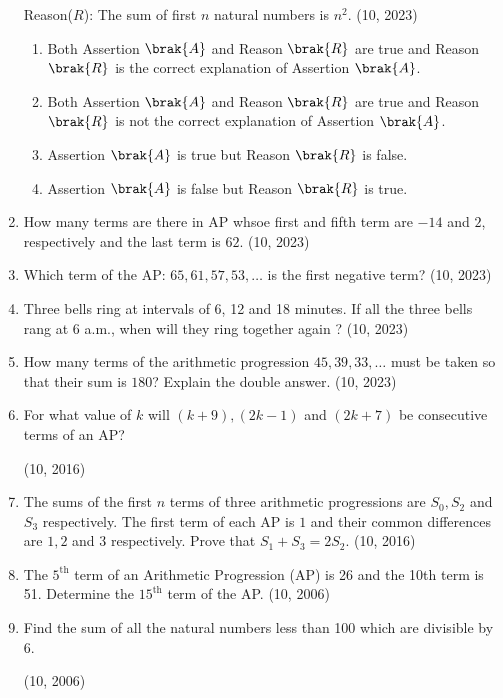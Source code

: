 \begin{enumerate}[label=\thesubsection.\arabic*,ref=\thesubsection.\theenumi,itemsep=1pt]
%
{Reason($R$):} The sum of first $n$ natural numbers is $n^2$.
\hfill (10, 2023)
\begin{enumerate}
\item Both Assertion $\brak{A}$ and Reason $\brak{R}$ are true and Reason $\brak{R}$ is the correct explanation of Assertion $\brak{A}$.
\item Both Assertion $\brak{A}$ and Reason $\brak{R}$ are true and Reason $\brak{R}$ is not the correct explanation of Assertion $\brak{A}$.
\item Assertion $\brak{A}$ is true but Reason $\brak{R}$ is false.
\item Assertion $\brak{A}$ is false but Reason $\brak{R}$ is true.
\end{enumerate}
\item
How many terms are there in  AP  whsoe first and fifth term are $-14$ and $2$, respectively and the last term is $62$.
\hfill (10, 2023)
\item
Which term of the AP: $65,61,57,53, \dots$ is the first negative term?
\hfill (10, 2023)
\item Three bells ring at intervals of  6, 12 and 18 minutes. If all the three bells rang at  6 a.m., when will they ring together again ?
\hfill (10, 2023)
\item How many terms of the arithmetic progression $45,39,33,\dots$ must be taken so that their sum is $180$? Explain the double answer.
	 \hfill (10, 2023)
\item For what value of $k$ will $(k+9), (2k-1)$ and $( 2k+7)$ be consecutive terms of an AP?

\hfill (10, 2016)
\item The sums of the first $n$ terms of three arithmetic progressions are $S_0, S_2$ and $S_3$ respectively. The first term of each AP is $1$ and their common differences are $1, 2$ and $3$ respectively. Prove that $S_1 + S_3 = 2S_2$.
								\hfill (10, 2016)
\item The $5^{\text{th}}$ term of an Arithmetic Progression (AP) is 26 and the 10th term is 51. Determine the $15^{\text{th}}$ term of the AP.
    \hfill (10, 2006)
\item Find the sum of all the natural numbers less than 100 which are divisible by 6.

    \hfill (10, 2006)
\end{enumerate}
%
